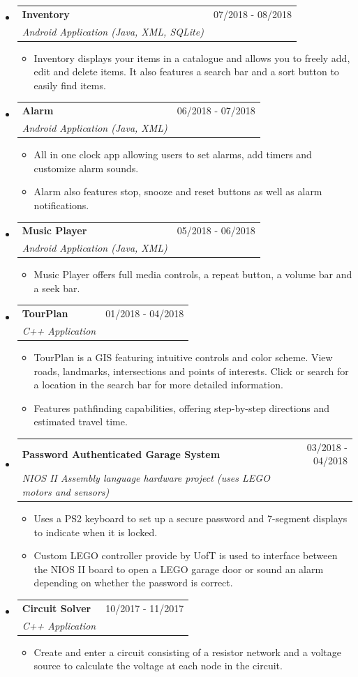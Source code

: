 \documentclass[letterpaper,11pt]{article}
\makeatletter
\newcommand{\resitem}[1]{\item #1 \vspace{-2pt}}
\newcommand{\ressubheading}[4]{
\begin{tabular*}{7.0in}{l@{\extracolsep{\fill}}r}
		\textbf{#1} & #2 \\
		\textit{#3} & \textit{#4} \\
\end{tabular*}\vspace{-6pt}}
\makeatother
\begin{document}
\begin{itemize}
    \item
    \ressubheading{Inventory}{07/2018 - 08/2018}{Android Application (Java, XML, SQLite)}{}
    \begin{itemize}
        \resitem{Inventory displays your items in a catalogue and allows you to freely add, edit and delete items. It also features a search bar and a sort button to easily find items.}
    \end{itemize}
    
    \item
    \ressubheading{Alarm}{06/2018 - 07/2018}{Android Application (Java, XML)}{}
    \begin{itemize}
        \resitem{All in one clock app allowing users to set alarms, add timers and customize alarm sounds.}
        \resitem{Alarm also features stop, snooze and reset buttons as well as alarm notifications.}
    \end{itemize}
 
 	\item
    \ressubheading{Music Player}{05/2018 - 06/2018}{Android Application (Java, XML)}{}
    \begin{itemize}
        \resitem{Music Player offers full media controls, a repeat button, a volume bar and a seek bar.}
    \end{itemize}
  
    \item
      \ressubheading{TourPlan}{01/2018 - 04/2018}{C++ Application}{}
      \begin{itemize}
          \resitem{TourPlan is a GIS featuring intuitive controls and color scheme. View roads, landmarks, intersections and points of interests. Click or search for a location in the search bar for more detailed information.}
          \resitem{Features pathfinding capabilities, offering step-by-step directions and estimated travel time.}
      \end{itemize}
      
    \item
      \ressubheading{Password Authenticated Garage System}{03/2018 - 04/2018}		{NIOS II Assembly language hardware project (uses LEGO motors and sensors)}{}
      \begin{itemize}
          \resitem{Uses a PS2 keyboard to set up a secure password and 7-segment displays to indicate when it is locked.}
          \resitem{Custom LEGO controller provide by UofT is used to interface between the NIOS II board to open a LEGO garage door or sound an alarm depending on whether the password is correct.}
      \end{itemize}  
  
  	\item
      \ressubheading{Circuit Solver}{10/2017 -   11/2017}{C++ Application}{}
      \begin{itemize}
          \resitem{Create and enter a circuit consisting of a resistor network and a voltage source to calculate the voltage at each node in the circuit.}
      \end{itemize}
    

\end{itemize}
\end{document}
